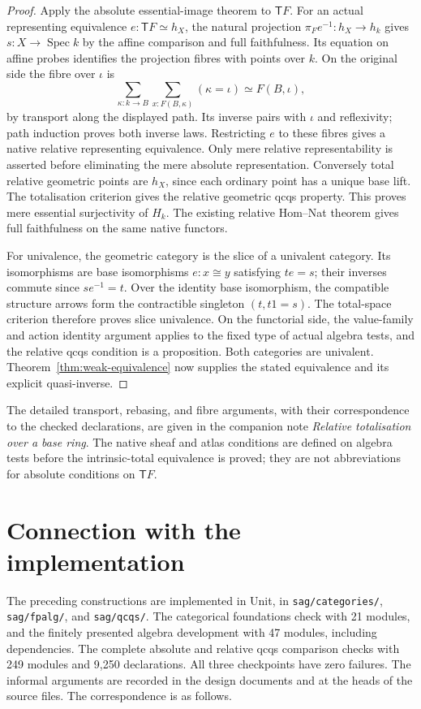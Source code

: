 \documentclass[11pt]{amsart}
\theoremstyle{definition}
\theoremstyle{remark}
\newcommand{\code}[1]{\texttt{\small #1}}
\begin{document}
\begin{proof}
Apply the absolute essential-image theorem to $\mathsf T F$. For an
actual representing equivalence $e:\mathsf T F\simeq h_X$, the natural
projection $\pi_F e^{-1}:h_X\to h_k$ gives $s:X\to\operatorname{Spec}k$
by the affine comparison and full faithfulness. Its equation on affine
probes identifies the projection fibres with points over $k$. On the
original side the fibre over $\iota$ is
\[
 \sum_{\kappa:k\to B}\sum_{x:F(B,\kappa)}(\kappa=\iota)
       \simeq F(B,\iota),
\]
by transport along the displayed path. Its inverse pairs with $\iota$
and reflexivity; path induction proves both inverse laws. Restricting
$e$ to these fibres gives a native relative representing equivalence.
Only mere relative representability is asserted before eliminating the
mere absolute representation. Conversely total relative geometric
points are $h_X$, since each ordinary point has a unique base lift.
The totalisation criterion gives the relative geometric qcqs property.
This proves mere essential surjectivity of $H_k$. The existing relative
Hom--Nat theorem gives full faithfulness on the same native functors.

For univalence, the geometric category is the slice of a univalent
category. Its isomorphisms are base isomorphisms $e:x\cong y$ satisfying
$te=s$; their inverses commute since $se^{-1}=t$. Over the identity
base isomorphism, the compatible structure arrows form the contractible
singleton $(t,t1=s)$. The total-space criterion therefore proves slice
univalence. On the functorial side, the value-family and action identity
argument applies to the fixed type of actual algebra tests, and the
relative qcqs condition is a proposition. Both categories are univalent.
Theorem~\ref{thm:weak-equivalence} now supplies the stated equivalence
and its explicit quasi-inverse.
\end{proof}

The detailed transport, rebasing, and fibre arguments, with their
correspondence to the checked declarations, are given in the companion
note \emph{Relative totalisation over a base ring}. The native sheaf
and atlas conditions are defined on algebra tests before the
intrinsic-total equivalence is proved; they are not abbreviations for
absolute conditions on $\mathsf T F$.

\section{Connection with the implementation}\label{sec:implementation}

The preceding constructions are implemented in Unit, in
\code{sag/categories/}, \code{sag/fpalg/}, and \code{sag/qcqs/}.
The categorical foundations check with 21 modules, and the finitely
presented algebra development with 47 modules, including dependencies.
The complete absolute and relative qcqs comparison checks with
249 modules and 9,250 declarations.
All three checkpoints have zero failures. The informal arguments are
recorded in the design documents and at the heads of the source files.
The correspondence is as follows.
\end{document}
